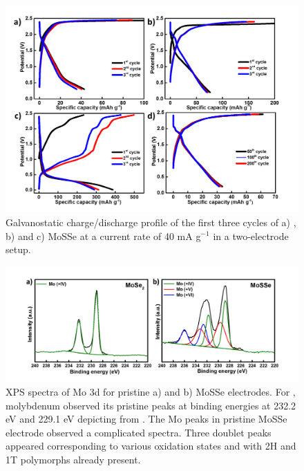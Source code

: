 \newcommand{\beginsupplement}{
               \setcounter{figure}{0}
        \renewcommand{\thefigure}{S\arabic{figure}}
     }
\beginsupplement
\begin{figure}[htb!]
\centering
\includegraphics[width=\textwidth]{Figures/chap4fig/S1}
\caption{Galvanostatic charge/discharge profile of the first three cycles of a) , b)  and c) MoSSe at a current rate of 40 mA g$^{-1}$ in a two-electrode setup.}
\label{Figures/chap4fig:S1}
\end{figure}
\begin{figure}[htb!]
\centering
\includegraphics[width=\textwidth]{Figures/chap4fig/S3}
\caption{XPS spectra of Mo 3d for pristine a)  and b) MoSSe electrodes. For , molybdenum observed its pristine peaks at binding energies at 232.2 eV and 229.1 eV depicting  from . The Mo peaks in pristine MoSSe electrode observed a complicated spectra. Three doublet peaks appeared corresponding to various oxidation states  and  with 2H and 1T polymorphs already present. }
\label{Figures/chap4fig:S3}
\end{figure}
